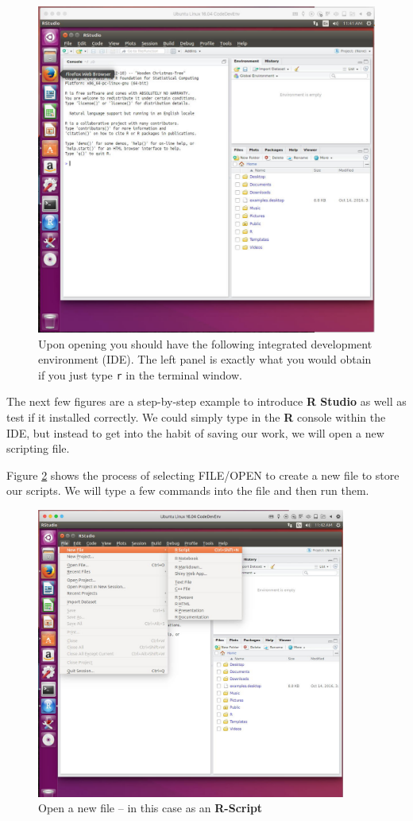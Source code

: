 \begin{figure}[h!] %
   \centering
   \includegraphics[width=4.5in]{./1-Introduction/LinuxRStudioOpen.jpg} 
   \caption{Upon opening you should have the following integrated development environment (IDE).   The left panel is exactly what you would obtain if
   you just type \texttt{r} in the terminal window.  }
   \label{fig:LinuxRStudioOpen}
\end{figure}

The next few figures are a step-by-step example to introduce \textbf{R Studio} as well as test if it installed correctly.
We could simply type in the \textbf{R} console within the IDE, but instead to get into the habit of saving our work, we will open a new scripting file.
\clearpage

Figure \ref{fig:LinuxRStudioNewFile} shows the process of selecting FILE/OPEN to create a new file to store our scripts.
We will type a few commands into the file and then run them.

\begin{figure}[h!] %
   \centering
   \includegraphics[width=4in]{./1-Introduction/LinuxRStudioNewFile.jpg} 
   \caption{Open a new file -- in this case as an \textbf{R-Script}}
   \label{fig:LinuxRStudioNewFile}
\end{figure}

